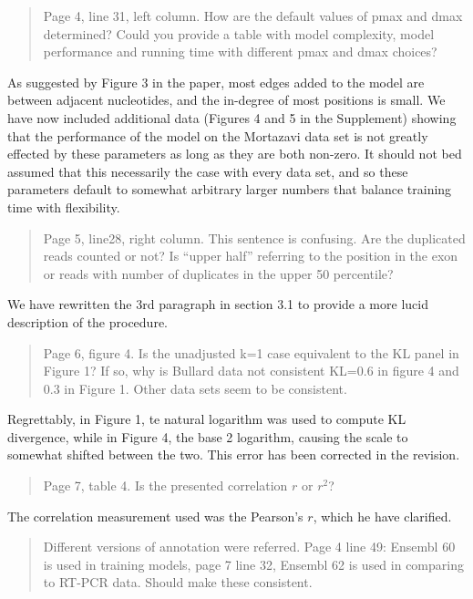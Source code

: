 \documentclass{article}
\begin{document}
\begin{quote}
Page 4, line 31, left column. How are the default values of pmax and dmax
determined? Could you provide a table with model complexity, model performance
and running time with different pmax and dmax choices?
\end{quote}

As suggested by Figure 3 in the paper, most edges added to the model are between
adjacent nucleotides, and the in-degree of most positions is small.  We have now
included additional data (Figures 4 and 5 in the Supplement) showing that the
performance of the model on the Mortazavi data set is not greatly effected by
these parameters as long as they are both non-zero. It should not bed assumed
that this necessarily the case with every data set, and so these parameters
default to somewhat arbitrary larger numbers that balance training time with
flexibility.


\begin{quote}
Page 5, line28, right column. This sentence is confusing. Are the duplicated
reads counted or not? Is ``upper half'' referring to the position in the exon or
reads with number of duplicates in the upper 50 percentile?
\end{quote}

We have rewritten the 3rd paragraph in section 3.1 to provide a more lucid
description of the procedure.


\begin{quote}
Page 6, figure 4. Is the unadjusted k=1 case equivalent to the KL panel in
Figure 1? If so, why is Bullard data not consistent KL=0.6 in figure 4 and 0.3
in Figure 1. Other data sets seem to be consistent.
\end{quote}

Regrettably, in Figure 1, te natural logarithm was used to compute KL
divergence, while in Figure 4, the base 2 logarithm, causing the scale to
somewhat shifted between the two. This error has been corrected in the revision.


\begin{quote}
Page 7, table 4. Is the presented correlation $r$ or $r^2$?
\end{quote}

The correlation measurement used was the Pearson's $r$, which he have clarified.


\begin{quote}
Different versions of annotation were referred. Page 4 line 49: Ensembl 60 is
used in training models, page 7 line 32, Ensembl 62 is used in comparing to
RT-PCR data. Should make these consistent.
\end{quote}
\end{document}
